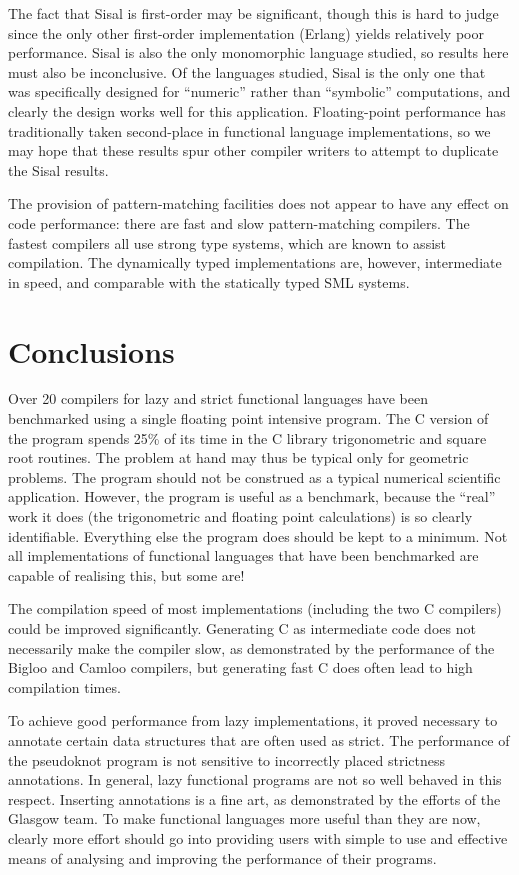 The fact that Sisal is first-order may be significant, though this is
hard to judge since the only other first-order implementation (Erlang)
yields relatively poor performance.  Sisal is also the only
monomorphic language studied, so results here must also be
inconclusive.  Of the languages studied, Sisal is the only
one that was specifically designed for ``numeric'' rather than
``symbolic'' computations, and clearly the design works well
for this application.  Floating-point performance has traditionally
taken second-place in functional language implementations, so
we may hope that these results spur other compiler writers to
attempt to duplicate the Sisal results.

The provision of pattern-matching facilities does not appear to have
any effect on code performance: there are fast and slow
pattern-matching compilers.  The fastest compilers all use strong type
systems, which are known to assist compilation.  The dynamically typed
implementations are, however, intermediate in speed, and comparable
with the statically typed SML systems.

\section{Conclusions}
\label{sec:conclusions}
Over 20 compilers for lazy and strict functional languages have been
benchmarked using a single floating point intensive program. The C
version of the program spends 25\% of its time in the C library
trigonometric and square root routines. The problem at hand may thus be
typical only for geometric problems. The program should not be
construed as a typical numerical scientific application. However, the
program is useful as a benchmark, because the ``real'' work it does
(the trigonometric and floating point calculations) is so clearly
identifiable. Everything else the program does should be kept to a
minimum. Not all implementations of functional languages that have been
benchmarked are capable of realising this, but some are!

The compilation speed of most implementations (including the two C
compilers) could be improved significantly. Generating C as
intermediate code does not necessarily make the compiler slow, as
demonstrated by the performance of the Bigloo and Camloo compilers,
but generating fast C does often lead to high compilation times.

To achieve good performance from lazy implementations, it proved
necessary to annotate certain data structures that are often used as
strict. The performance of the pseudoknot program is not sensitive to
incorrectly placed strictness annotations. In general, lazy functional
programs are not so well behaved in this respect. Inserting annotations
is a fine art, as demonstrated by the efforts of the Glasgow team. To
make functional languages more useful than they are now, clearly more
effort should go into providing users with simple to use and effective
means of analysing and improving the performance of their programs.

